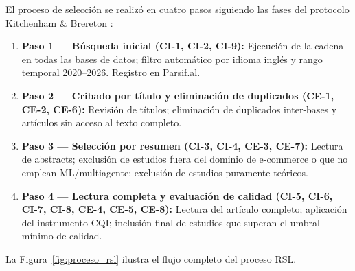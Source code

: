 \documentclass[12pt, a4paper]{article}
\begin{document}
El proceso de selecci\'on se realiz\'o en cuatro pasos siguiendo las fases
del protocolo Kitchenham \& Brereton \cite{Kitchenham2007}:

\begin{enumerate}
  \item \textbf{Paso 1 --- B\'usqueda inicial (CI-1, CI-2, CI-9):}
        Ejecuci\'on de la cadena en todas las bases de datos; filtro
        autom\'atico por idioma ingl\'es y rango temporal 2020--2026.
        Registro en Parsif.al.
  \item \textbf{Paso 2 --- Cribado por t\'itulo y eliminaci\'on de duplicados
        (CE-1, CE-2, CE-6):}
        Revisi\'on de t\'itulos; eliminaci\'on de duplicados inter-bases y
        art\'iculos sin acceso al texto completo.
  \item \textbf{Paso 3 --- Selecci\'on por resumen (CI-3, CI-4, CE-3, CE-7):}
        Lectura de abstracts; exclusi\'on de estudios fuera del dominio de
        e-commerce o que no emplean ML/multiagente; exclusi\'on de estudios
        puramente te\'oricos.
  \item \textbf{Paso 4 --- Lectura completa y evaluaci\'on de calidad
        (CI-5, CI-6, CI-7, CI-8, CE-4, CE-5, CE-8):}
        Lectura del art\'iculo completo; aplicaci\'on del instrumento CQI;
        inclusi\'on final de estudios que superan el umbral m\'inimo de
        calidad.
\end{enumerate}

La Figura~\ref{fig:proceso_rsl} ilustra el flujo completo del proceso RSL.
\end{document}
